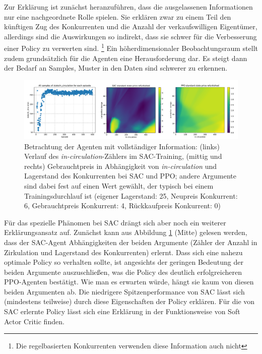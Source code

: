 Zur Erklärung ist zunächst heranzuführen, dass die ausgelassenen Informationen nur eine nachgeordnete Rolle spielen.
Sie erklären zwar zu einem Teil den künftigen Zug des Konkurrenten und die Anzahl der verkaufswilligen Eigentümer, allerdings sind die Auswirkungen so indirekt, dass sie schwer für die Verbesserung einer Policy zu verwerten sind. \footnote{Die regelbasierten Konkurrenten verwenden diese Information auch nicht}
Ein höherdimensionaler Beobachtungsraum stellt zudem grundsätzlich für die Agenten eine Herausforderung dar.
Es steigt dann der Bedarf an Samples, Muster in den Daten sind schwerer zu erkennen.

\begin{figure}[htbp]
	\centering
	\includegraphics[width=\textwidth]{main/sac_in_circulation_dependend_explanation.pdf}
	\caption{Betrachtung der Agenten mit vollständiger Information: (links) Verlauf des \textit{in-circulation}-Zählers im SAC-Training, (mittig und rechts) Gebrauchtpreis in Abhängigkeit von \textit{in-circulation} und Lagerstand des Konkurrenten bei SAC und PPO; andere Argumente sind dabei fest auf einen Wert gewählt, der typisch bei einem Trainingsdurchlauf ist (eigener Lagerstand: 25, Neupreis Konkurrent: 6, Gebrauchtpreis Konkurrent: 4, Rückkaufpreis Konkurrent: 0)}
	\label{grafic:InCirculationExplain}
\end{figure}
Für das spezielle Phänomen bei SAC drängt sich aber noch ein weiterer Erklärungsansatz auf.
Zunächst kann aus Abbildung \ref{grafic:InCirculationExplain} (Mitte) gelesen werden, dass der SAC-Agent Abhängigkeiten der beiden Argumente (Zähler der Anzahl in Zirkulation und Lagerstand des Konkurrenten) erlernt.
Dass sich eine nahezu optimale Policy so verhalten sollte, ist angesichts der geringen Bedeutung der beiden Argumente auszuschließen, was die Policy des deutlich erfolgreicheren PPO-Agenten bestätigt.
Wie man es erwarten würde, hängt sie kaum von diesen beiden Argumenten ab.
Die niedrigere Spitzenperformance von SAC lässt sich (mindestens teilweise) durch diese Eigenschaften der Policy erklären.
Für die von SAC erlernte Policy lässt sich eine Erklärung in der Funktionsweise von Soft Actor Critic finden.
